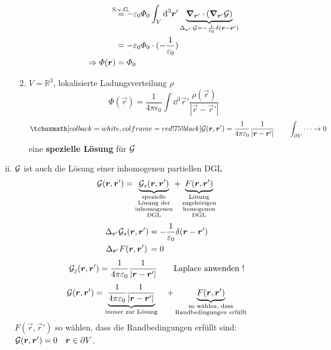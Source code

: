 \begin{enumerate}[i)]
\begin{enumerate}[1)]
\begin{minipage}{.6\linewidth}
\begin{align*}
			&\buildrel \mathclap{\tx{S.v.G.}} \over = - \epsilon_0 \Phi_0 \int_V \dd^3 \vec{r}' \ub{\vec{\nabla}_{\vec{r}'} \cdot (\vec{\nabla}_{\vec{r}'} \mathcal{G})}_{\Delta_{\vec{r}'} \cdot \mathcal{G} = - \frac{1}{\epsilon_0} \delta(\vec{r} - \vec{r}')}\\
			&= - \epsilon_0 \Phi_0 \cdot (- \frac{1}{\epsilon_0})\\
			\Rightarrow \Phi(\vec{r}) &= \Phi_0
			\end{align*}
		\end{minipage}%
		\item $ V = \mathbb{R}^3 $, lokalisierte Ladungsverteilung $ \rho $
		\begin{equation*}
		\Phi(\vec{r}) = \frac{1}{4 \pi \epsilon_0} \int \dd^3 \vec{r}' \frac{\rho(\vec{r})}{|\vec{r} - \vec{r}'|}
		\end{equation*}
		\begin{equation*}
		\rmbox{ \gre(\vec{r},\vec{r}') = \kq \frac{1}{|\vec{r} - \vec{r}'|}} \qquad \int_{\partial V} \dots \rightarrow 0
		\end{equation*}
		eine \textbf{spezielle Lösung} für $ \mathcal{G} $
	\end{enumerate}
	\item $ \mathcal{G} $ ist auch die Lösung einer inhomogenen partiellen DGL
	\begin{equation*}
	\mathcal{G}(\bm{r},\bm{r}') = \underbrace{\mathcal{G}_s(\bm{r},\bm{r}')}_{\substack{\textrm{spezielle} \\ \textrm{Lösung der} \\ \textrm{inhomogenen} \\ \textrm{DGL}}} + \underbrace{F(\bm{r},\bm{r}')}_{\substack{\textrm{Lösung} \\ \textrm{zugehörigen} \\ \textrm{homogenen} \\ \textrm{DGL}}}
	\end{equation*}
	\begin{align*}
	\Delta_{\bm{r}'} \mathcal{G}_s(\bm{r},\bm{r}') &= - \frac{1}{\varepsilon_0} \delta(\bm{r} - \bm{r}')\\
	\Delta_{\bm{r}'} F(\bm{r},\bm{r}') \, &= 0
	\end{align*}
	\begin{equation*}
	\mathcal{G}_j(\bm{r},\bm{r}') = \frac{1}{4\pi\varepsilon_0} \frac{1}{|\bm{r} - \bm{r}'|} \qquad \textrm{Laplace anwenden !}
	\end{equation*}
	\begin{equation*}
	\mathcal{G}(\bm{r},\bm{r}') = \underbrace{\frac{1}{4\pi\varepsilon_0} \frac{1}{|\bm{r} - \bm{r}'|}}_{\textrm{immer zur Lösung}} \quad + \underbrace{F(\bm{r},\bm{r}')}_{\substack{\textrm{so wählen, dass} \\ \textrm{Randbedingungen erfüllt}}}
	\end{equation*}
	$ F(\vec{r},\vec{r}') $ so wählen, dass die Randbedingungen erfüllt sind: $ \mathcal{G}(\bm{r},\bm{r}') = 0 \quad \bm{r} \in \partial V $.
\end{enumerate}

